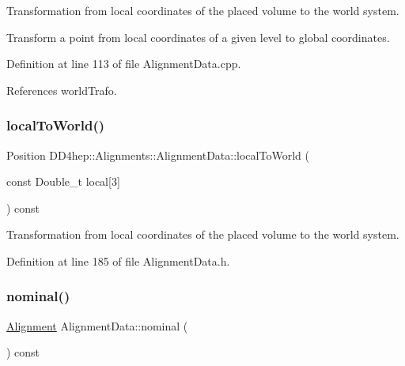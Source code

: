 Transformation from local coordinates of the placed volume to the world system. 

Transform a point from local coordinates of a given level to global coordinates. 

Definition at line 113 of file Alignment\+Data.\+cpp.



References world\+Trafo.

\hypertarget{class_d_d4hep_1_1_alignments_1_1_alignment_data_a662ee0cd2932cadb2487e9ddf0f25e1f}{}\label{class_d_d4hep_1_1_alignments_1_1_alignment_data_a662ee0cd2932cadb2487e9ddf0f25e1f} 
\subsubsection{\texorpdfstring{local\+To\+World()}{localToWorld()}\hspace{0.1cm}{\footnotesize\ttfamily [5/5]}}
{\footnotesize\ttfamily Position D\+D4hep\+::\+Alignments\+::\+Alignment\+Data\+::local\+To\+World (\begin{DoxyParamCaption}\item[{const Double\+\_\+t}]{local\mbox{[}3\mbox{]} }\end{DoxyParamCaption}) const\hspace{0.3cm}{\ttfamily [inline]}}



Transformation from local coordinates of the placed volume to the world system. 



Definition at line 185 of file Alignment\+Data.\+h.

\hypertarget{class_d_d4hep_1_1_alignments_1_1_alignment_data_a1ad26965bc90bc605a93cbee82e9e773}{}\label{class_d_d4hep_1_1_alignments_1_1_alignment_data_a1ad26965bc90bc605a93cbee82e9e773} 
\subsubsection{\texorpdfstring{nominal()}{nominal()}}
{\footnotesize\ttfamily \hyperlink{class_d_d4hep_1_1_alignments_1_1_alignment}{Alignment} Alignment\+Data\+::nominal (\begin{DoxyParamCaption}{ }\end{DoxyParamCaption}) const}




